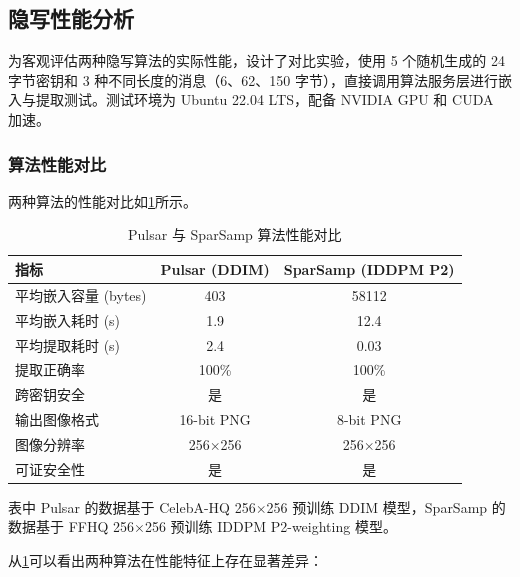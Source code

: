 \subsection{隐写性能分析}

为客观评估两种隐写算法的实际性能，设计了对比实验，使用 5 个随机生成的 24 字节密钥和 3 种不同长度的消息（6、62、150 字节），直接调用算法服务层进行嵌入与提取测试。测试环境为 Ubuntu 22.04 LTS，配备 NVIDIA GPU 和 CUDA 加速。

\subsubsection{算法性能对比}

两种算法的性能对比如\cref{tab:algo_comparison}所示。

\begin{table}[htbp]
    \caption{Pulsar 与 SparSamp 算法性能对比}
    \centering
    \begin{tabular}{lcc}
        \hline
        \textbf{指标} & \textbf{Pulsar (DDIM)} & \textbf{SparSamp (IDDPM P2)} \\
        \hline
        平均嵌入容量 (bytes) & 403 & 58112 \\
        平均嵌入耗时 (s) & 1.9 & 12.4 \\
        平均提取耗时 (s) & 2.4 & 0.03 \\
        提取正确率 & 100\% & 100\% \\
        跨密钥安全 & 是 & 是 \\
        输出图像格式 & 16-bit PNG & 8-bit PNG \\
        图像分辨率 & 256$\times$256 & 256$\times$256 \\
        可证安全性 & 是 & 是 \\
        \hline
    \end{tabular}
    \label{tab:algo_comparison}
\end{table}

表中 Pulsar 的数据基于 CelebA-HQ 256$\times$256 预训练 DDIM 模型，SparSamp 的数据基于 FFHQ 256$\times$256 预训练 IDDPM P2-weighting 模型。

从\cref{tab:algo_comparison}可以看出两种算法在性能特征上存在显著差异：


